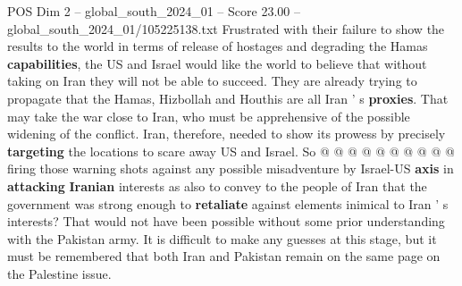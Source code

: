 \begin{textsample}{POS Dim 2 – global\_south\_2024\_01 – Score 23.00 – global\_south\_2024\_01/105225138.txt}
Frustrated with their failure to show the results to the world in terms of release of hostages and degrading the Hamas \textbf{capabilities}, the US and Israel would like the world to believe that without taking on Iran they will not be able to succeed.
They are already trying to propagate that the Hamas, Hizbollah and Houthis are all Iran ' s \textbf{proxies}.
That may take the war close to Iran, who must be apprehensive of the possible widening of the conflict.
Iran, therefore, needed to show its prowess by precisely \textbf{targeting} the locations to scare away US and Israel.
So @ @ @ @ @ @ @ @ @ @ firing those warning shots against any possible misadventure by Israel-US \textbf{axis} in \textbf{attacking} \textbf{Iranian} interests as also to convey to the people of Iran that the government was strong enough to \textbf{retaliate} against elements inimical to Iran ' s interests?
That would not have been possible without some prior understanding with the Pakistan army.
It is difficult to make any guesses at this stage, but it must be remembered that both Iran and Pakistan remain on the same page on the Palestine issue.

\end{textsample}
